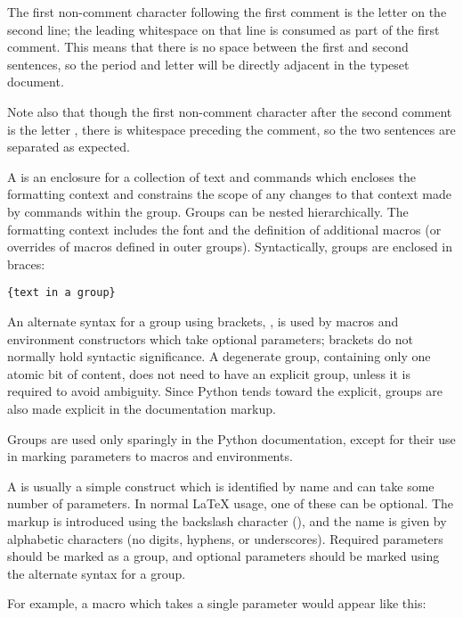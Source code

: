 \documentclass{howto}
\begin{document}
    The first non-comment character following the first comment is the
    letter  on the second line; the leading whitespace on
    that line is consumed as part of the first comment.  This means
    that there is no space between the first and second sentences, so
    the period and letter  will be directly adjacent in
    the typeset document.

    Note also that though the first non-comment character after the
    second comment is the letter , there is whitespace
    preceding the comment, so the two sentences are separated as
    expected.

    A  is an enclosure for a collection of text and
    commands which encloses the formatting context and constrains the
    scope of any changes to that context made by commands within the
    group.  Groups can be nested hierarchically.  The formatting
    context includes the font and the definition of additional macros
    (or overrides of macros defined in outer groups).  Syntactically,
    groups are enclosed in braces:

\begin{verbatim}
{text in a group}
\end{verbatim}

    An alternate syntax for a group using brackets, \code{[...]}, is
    used by macros and environment constructors which take optional
    parameters; brackets do not normally hold syntactic significance.
    A degenerate group, containing only one atomic bit of content,
    does not need to have an explicit group, unless it is required to
    avoid ambiguity.  Since Python tends toward the explicit, groups
    are also made explicit in the documentation markup.

    Groups are used only sparingly in the Python documentation, except
    for their use in marking parameters to macros and environments.

    A  is usually a simple construct which is identified by
    name and can take some number of parameters.  In normal \LaTeX{}
    usage, one of these can be optional.  The markup is introduced
    using the backslash character (\character{\e}), and the name is
    given by alphabetic characters (no digits, hyphens, or
    underscores).  Required parameters should be marked as a group,
    and optional parameters should be marked using the alternate
    syntax for a group.

    For example, a macro which takes a single parameter
    would appear like this:
\end{document}
